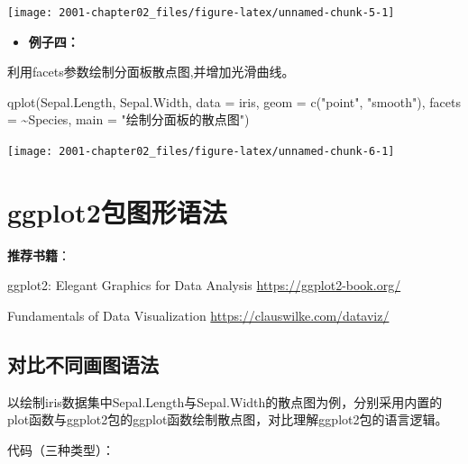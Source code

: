 \documentclass[
]{book}
\newenvironment{Shaded}{\begin{snugshade}}{\end{snugshade}}
\newcommand{\AttributeTok}[1]{\textcolor[rgb]{0.77,0.63,0.00}{#1}}
\newcommand{\FunctionTok}[1]{\textcolor[rgb]{0.00,0.00,0.00}{#1}}
\newcommand{\NormalTok}[1]{#1}
\newcommand{\SpecialCharTok}[1]{\textcolor[rgb]{0.00,0.00,0.00}{#1}}
\newcommand{\StringTok}[1]{\textcolor[rgb]{0.31,0.60,0.02}{#1}}
\providecommand{\tightlist}{%
  \setlength{\itemsep}{0pt}\setlength{\parskip}{0pt}}
\begin{document}
\begin{center}\texttt{[image: 2001-chapter02\_files/figure-latex/unnamed-chunk-5-1]} \end{center}

\begin{itemize}
\tightlist
\item
  \textbf{例子四：}
\end{itemize}

利用facets参数绘制分面板散点图,并增加光滑曲线。

\begin{Shaded}
\begin{Highlighting}[]
\FunctionTok{qplot}\NormalTok{(Sepal.Length, Sepal.Width, }\AttributeTok{data =}\NormalTok{ iris, }\AttributeTok{geom =} \FunctionTok{c}\NormalTok{(}\StringTok{"point"}\NormalTok{, }\StringTok{"smooth"}\NormalTok{), }\AttributeTok{facets =} \SpecialCharTok{\textasciitilde{}}\NormalTok{Species, }
    \AttributeTok{main =} \StringTok{"绘制分面板的散点图"}\NormalTok{)}
\end{Highlighting}
\end{Shaded}

\begin{center}\texttt{[image: 2001-chapter02\_files/figure-latex/unnamed-chunk-6-1]} \end{center}

\hypertarget{ggplot2ux5305ux56feux5f62ux8bedux6cd5}{%
\section{ggplot2包图形语法}\label{ggplot2ux5305ux56feux5f62ux8bedux6cd5}}

\textbf{推荐书籍}：

ggplot2: Elegant Graphics for Data Analysis \url{https://ggplot2-book.org/}

Fundamentals of Data Visualization \url{https://clauswilke.com/dataviz/}

\hypertarget{ux5bf9ux6bd4ux4e0dux540cux753bux56feux8bedux6cd5}{%
\subsection{对比不同画图语法}\label{ux5bf9ux6bd4ux4e0dux540cux753bux56feux8bedux6cd5}}

以绘制iris数据集中Sepal.Length与Sepal.Width的散点图为例，分别采用内置的plot函数与ggplot2包的ggplot函数绘制散点图，对比理解ggplot2包的语言逻辑。

代码（三种类型）：
\end{document}
